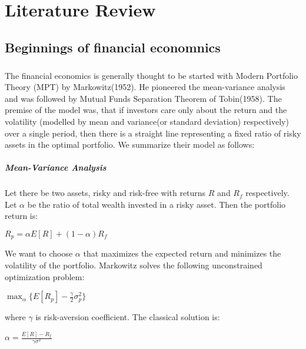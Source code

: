 \chapter{Literature Review}
\label{litreview}

\section{Beginnings of financial economnics}

\paragraph*{}The financial economics is generally thought to be started with Modern Portfolio Theory (MPT) by Markowitz(1952). He pioneered the mean-variance analysis and was followed by Mutual Funds Separation Theorem of Tobin(1958). The premise of the model was, that if investors care only about the return and the volatility (modelled by mean and variance(or standard deviation) respectively) over a single period, then there is a straight line representing a fixed ratio of risky assets in the optimal portfolio. We summarize their model as follows:

\paragraph*{Mean-Variance Analysis}
Let there be two assets, risky and risk-free with returns $R$ and $R_f$ respectively. Let $\alpha$ be the ratio of total wealth invested in a risky asset. Then the portfolio return is:

\begin{center}
  $R_p = \alpha E[R] + (1-\alpha) R_f$
\end{center}

We want to choose $\alpha$ that maximizes the expected return and minimizes the volatility of the portfolio. Markowitz solves the following unconstrained optimization problem:

\begin{center}
  $\displaystyle\max_{\alpha} \{ E[R_p] - \frac{\gamma}{2}\sigma^2_p \}$
\end{center}

where $\gamma$ is risk-aversion coefficient. The classical solution is:

\begin{center}
	$\alpha = \frac{E[R] - R_f}{\gamma\sigma^2}$
\end{center}

